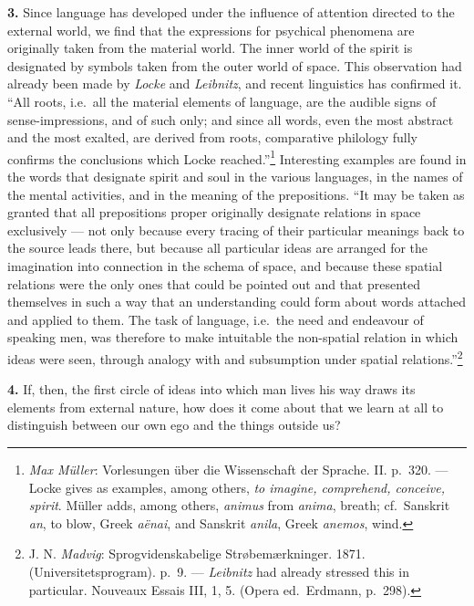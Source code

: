 \documentclass[12pt,a4paper]{book}
\newcommand{\opage}[1]{\marginnote{\footnotesize\textit{[#1]}}}
\begin{document}
\textbf{3.} Since language has developed under the influence of
attention directed to the external world, we find that the expressions
for psychical phenomena are originally taken from the material world.
The inner world of the spirit is designated by symbols taken from the
outer world of space. This observation had already been made by
\emph{Locke} and \emph{Leibnitz}, and recent linguistics has confirmed
it. ``All roots, i.e.\ all the material elements of language, are the
audible signs of sense-impressions, and of such only; and since all
words, even the most abstract and the most exalted, are derived from
roots, comparative philology fully confirms the conclusions which Locke
reached.''\footnote{\emph{Max Müller}: Vorlesungen über die Wissenschaft
der Sprache. II. p.~320. --- Locke gives as examples, among others,
\textit{to imagine, comprehend, conceive, spirit}. Müller adds, among
others, \textit{animus} from \textit{anima}, breath; cf.\ Sanskrit \textit{an},
to blow, Greek \textit{aënai}, and Sanskrit \textit{anila}, Greek
\textit{anemos}, wind.} Interesting examples are found in the words that
designate spirit and soul in the various
\opage{3}languages, in the names of the mental activities, and in the
meaning of the prepositions. ``It may be taken as granted that all
prepositions proper originally designate relations in space exclusively
--- not only because every tracing of their particular meanings back to
the source leads there, but because all particular ideas are arranged
for the imagination into connection in the schema of space, and because
these spatial relations were the only ones that could be pointed out and
that presented themselves in such a way that an understanding could form
about words attached and applied to them. The task of language, i.e.\
the need and endeavour of speaking men, was therefore to make
intuitable the non-spatial relation in which ideas were seen, through
analogy with and subsumption under spatial relations.''\footnote{J. N.
\emph{Madvig}: Sprogvidenskabelige Strøbemærkninger. 1871.
(Universitetsprogram). p.~9. --- \emph{Leibnitz} had already stressed
this in particular. Nouveaux Essais III, 1, 5. (Opera ed.\ Erdmann,
p.~298).}

\textbf{4.} If, then, the first circle of ideas into which man lives his
way draws its elements from external nature, how does it come about that
we learn at all to distinguish between our own ego and the things
outside us?
\end{document}

